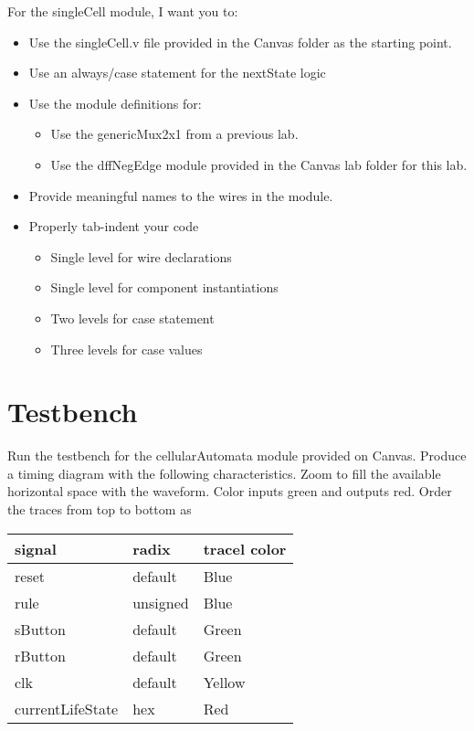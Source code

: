 \protect\hypertarget{singleCell_verilog}{}{}For the singleCell module, I
want you to:

\begin{itemize}
\item
  Use the singleCell.v file provided in the Canvas folder as the
  starting point.
\item
  Use an always/case statement for the nextState logic
\item
  Use the module definitions for:

  \begin{itemize}
  \item
    Use the genericMux2x1 from a previous lab.
  \item
    Use the dffNegEdge module provided in the Canvas lab folder for this
    lab.
  \end{itemize}
\item
  Provide meaningful names to the wires in the module.
\item
  Properly tab-indent your code

  \begin{itemize}
  \item
    Single level for wire declarations
  \item
    Single level for component instantiations
  \item
    Two levels for case statement
  \item
    Three levels for case values
  \end{itemize}
\end{itemize}

\section{Testbench}
\label{section:caTestbench}

  Run the testbench for the cellularAutomata module provided on Canvas.
  Produce a timing diagram with the following characteristics. Zoom to
  fill the available horizontal space with the waveform. Color inputs
  green and outputs red. Order the traces from top to bottom as

\begin{tabular}{p{4cm}p{4cm}p{4cm}}
signal		& radix				& tracel color \\ \hline
    reset 			& default 			& Blue  \\ 
    rule 			&  unsigned 			& Blue \\ 
    sButton 			& default 		& Green \\ 
    rButton 			& default 		& Green \\ 
    clk 				& default 		& Yellow \\ 
    currentLifeState 	& hex 			& Red \\
  \end{tabular}


